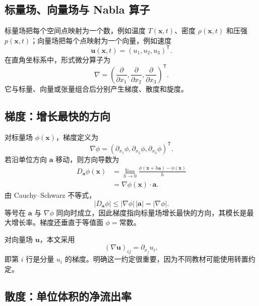 \documentclass[cn,hazy,blue,11pt,normal]{elegantnote}
\numberwithin{equation}{section}
\newcommand{\vct}[1]{\bm{#1}}
\begin{document}
\subsection{标量场、向量场与 Nabla 算子}

标量场把每个空间点映射为一个数，例如温度 $T(\vct x,t)$、密度 $\rho(\vct x,t)$ 和压强 $p(\vct x,t)$；向量场把每个点映射为一个向量，例如速度
\begin{equation}
 \vct u(\vct x,t)=(u_1,u_2,u_3)^{\mathsf T}.
\end{equation}
在直角坐标系中，形式微分算子为
\begin{equation}
 \nabla=\left(\frac{\partial}{\partial x_1},
 \frac{\partial}{\partial x_2},
 \frac{\partial}{\partial x_3}\right)^{\mathsf T}.
\end{equation}
它与标量、向量或张量组合后分别产生梯度、散度和旋度。

\subsection{梯度：增长最快的方向}

对标量场 $\phi(\vct x)$，梯度定义为
\begin{equation}
 \boxed{\nabla\phi=
 \left(\partial_{x_1}\phi,\partial_{x_2}\phi,
 \partial_{x_3}\phi\right)^{\mathsf T}.}
\end{equation}
若沿单位方向 $\vct a$ 移动，则方向导数为
\begin{align}
 D_{\vct a}\phi(\vct x)
 &=\lim_{h\to0}\frac{\phi(\vct x+h\vct a)-\phi(\vct x)}{h}\\
 &=\nabla\phi(\vct x)\cdot\vct a.
\end{align}
由 Cauchy--Schwarz 不等式，
\begin{equation}
 |D_{\vct a}\phi|\le|\nabla\phi|\,|\vct a|=|\nabla\phi|.
\end{equation}
等号在 $\vct a$ 与 $\nabla\phi$ 同向时成立，因此梯度指向标量场增长最快的方向，其模长是最大增长率。梯度还垂直于等值面 $\phi=\text{常数}$。

对向量场 $\vct u$，本文采用
\begin{equation}
 (\nabla\vct u)_{ij}=\partial_{x_j}u_i,
\end{equation}
即第 $i$ 行是分量 $u_i$ 的梯度。明确这一约定很重要，因为不同教材可能使用转置约定。

\subsection{散度：单位体积的净流出率}
\end{document}
